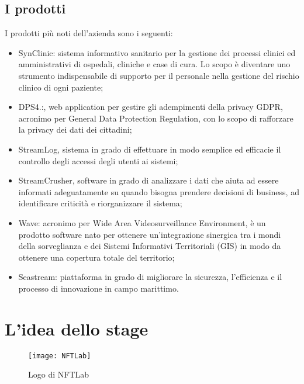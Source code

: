 \subsection{I prodotti}

I prodotti più noti dell'azienda sono i seguenti:
\begin{itemize}
	\item SynClinic: sistema informativo sanitario per la gestione dei processi clinici ed amministrativi di ospedali, cliniche e case di cura. Lo scopo è diventare uno strumento indispensabile di supporto per il personale nella gestione del rischio clinico di ogni paziente;
	\item DPS4.:, web application per gestire gli adempimenti della privacy GDPR, acronimo per General Data Protection Regulation, con lo scopo di rafforzare la privacy dei dati dei cittadini;
	\item StreamLog, sistema in grado di effettuare in modo semplice ed efficacie il controllo degli accessi degli utenti ai sistemi;
	\item StreamCrusher, software in grado di analizzare i dati che aiuta ad essere informati adeguatamente su quando bisogna prendere decisioni di business, ad identificare criticità e riorganizzare il sistema;
	\item Wave: acronimo per Wide Area Videosurveillance Environment, è un prodotto software nato per ottenere un'integrazione sinergica tra i mondi della sorveglianza e dei Sistemi Informativi Territoriali (GIS) in modo da ottenere una copertura totale del territorio;
	\item Seastream: piattaforma in grado di migliorare la sicurezza, l'efficienza e il processo di innovazione in campo marittimo.
\end{itemize}

\section{L'idea dello stage}

\begin{figure}[H]
	\begin{center}
		\texttt{[image: NFTLab]}
		\caption{Logo di NFTLab}
	\end{center}
\end{figure}

